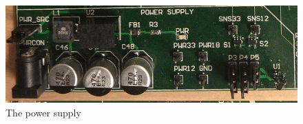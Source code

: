 \begin{figure}[H]
    \centering
    \includegraphics[scale=0.15]{figures/intro/pcb/bitless_psu}
    \caption{The power supply}
    \label{fig:psu}
\end{figure}
